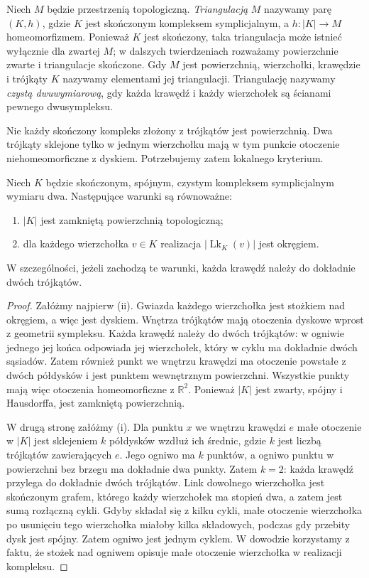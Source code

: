 \begin{definicja}[Triangulacja]
Niech $M$ będzie przestrzenią topologiczną. \emph{Triangulacją}
$M$ nazywamy parę $(K,h)$, gdzie $K$ jest skończonym
kompleksem symplicjalnym, a $h:|K|\to M$ homeomorfizmem.
Ponieważ $K$ jest skończony, taka triangulacja może istnieć
wyłącznie dla zwartej $M$; w dalszych twierdzeniach rozważamy
powierzchnie zwarte i triangulacje skończone. Gdy $M$ jest
powierzchnią, wierzchołki, krawędzie i trójkąty $K$ nazywamy
elementami jej triangulacji. Triangulację
nazywamy \emph{czystą dwuwymiarową}, gdy każda krawędź
i każdy wierzchołek są ścianami pewnego dwusympleksu.
\end{definicja}

Nie każdy skończony kompleks złożony z trójkątów jest
powierzchnią. Dwa trójkąty sklejone tylko w jednym
wierzchołku mają w tym punkcie otoczenie niehomeomorficzne
z dyskiem. Potrzebujemy zatem lokalnego kryterium.

\begin{twierdzenie}
\label{thm:tg-link-surface}
Niech $K$ będzie skończonym, spójnym, czystym
kompleksem symplicjalnym wymiaru dwa. Następujące warunki
są równoważne:
\begin{enumerate}[label=(\roman*)]
\item $|K|$ jest zamkniętą powierzchnią topologiczną;
\item dla każdego wierzchołka $v\in K$ realizacja
$|\operatorname{Lk}_K(v)|$ jest okręgiem.
\end{enumerate}
W szczególności, jeżeli zachodzą te warunki, każda
krawędź należy do dokładnie dwóch trójkątów.
\end{twierdzenie}

\begin{proof}
Załóżmy najpierw (ii). Gwiazda każdego wierzchołka jest
stożkiem nad okręgiem, a więc jest dyskiem. Wnętrza trójkątów
mają otoczenia dyskowe wprost z geometrii sympleksu.
Każda krawędź należy do dwóch trójkątów: w ogniwie jednego
jej końca odpowiada jej wierzchołek, który w cyklu ma
dokładnie dwóch sąsiadów. Zatem również punkt we wnętrzu
krawędzi ma otoczenie powstałe z dwóch półdysków i jest
punktem wewnętrznym powierzchni. Wszystkie punkty mają
więc otoczenia homeomorficzne z $\mathbb R^2$. Ponieważ
$|K|$ jest zwarty, spójny i Hausdorffa, jest zamkniętą
powierzchnią.

W drugą stronę załóżmy (i). Dla punktu $x$ we wnętrzu
krawędzi $e$ małe otoczenie w $|K|$ jest sklejeniem
$k$ półdysków wzdłuż ich średnic, gdzie $k$ jest liczbą
trójkątów zawierających $e$. Jego ogniwo ma $k$ punktów,
a ogniwo punktu w powierzchni bez brzegu ma dokładnie
dwa punkty. Zatem $k=2$: każda krawędź przylega do
dokładnie dwóch trójkątów. Link dowolnego
wierzchołka jest skończonym grafem, którego każdy
wierzchołek ma stopień dwa, a zatem jest sumą rozłączną
cykli. Gdyby składał się z kilku cykli, małe otoczenie
wierzchołka po usunięciu tego wierzchołka miałoby kilka
składowych, podczas gdy przebity dysk jest spójny.
Zatem ogniwo jest jednym cyklem. W dowodzie korzystamy
z faktu, że stożek nad ogniwem opisuje małe otoczenie
wierzchołka w realizacji kompleksu.
\end{proof}

